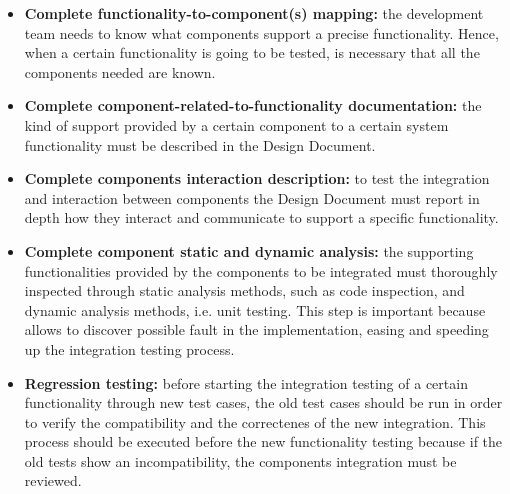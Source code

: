\begin{itemize}
	\item \textbf{Complete functionality-to-component(s) mapping:} the development team needs to know what components support a precise functionality. Hence, when a certain functionality is going to be tested, is necessary that all the components needed are known.
	\item \textbf{Complete component-related-to-functionality documentation:} the kind of support provided by a certain component to a certain system functionality must be described in the Design Document.
	\item \textbf{Complete components interaction description:} to test the integration and interaction between components the Design Document must report in depth how they interact and communicate to support a specific functionality.
	\item \textbf{Complete component static and dynamic analysis:} the supporting functionalities provided by the components to be integrated must thoroughly inspected through static analysis methods, such as code inspection, and dynamic analysis methods, i.e. unit testing. This step is important because allows to discover possible fault in the implementation, easing and speeding up the integration testing process.
	\item \textbf{Regression testing:} before starting the integration testing of a certain functionality through new test cases, the old test cases should be run in order to verify the compatibility and the correctenes of the new integration. This process should be executed before the new functionality testing because if the old tests show an incompatibility, the components integration must be reviewed.
\end{itemize}
